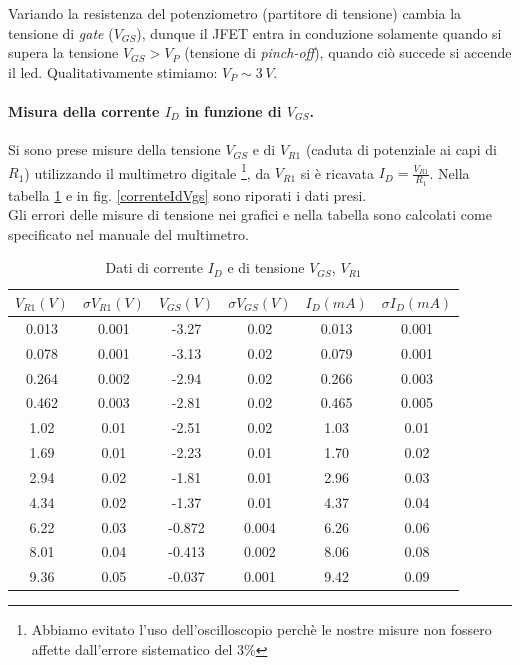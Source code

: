 \documentclass[10pt,a4paper]{article}
\begin{document}
Variando la resistenza del potenziometro (partitore di tensione) cambia la tensione di \emph{gate} ($V_{GS}$), dunque il JFET entra in conduzione solamente quando si supera la tensione $V_{GS} > V_{P}$ (tensione di \emph{pinch-off}), quando ciò succede si accende il led. Qualitativamente stimiamo: $V_P \sim 3\,V$. 

\paragraph{Misura della corrente $I_D$ in funzione di $V_{GS}$.}
Si sono prese misure della tensione $V_{GS}$ e di $V_{R1}$ (caduta di potenziale ai capi di $R_1$) utilizzando il multimetro digitale \footnote{Abbiamo evitato l'uso dell'oscilloscopio perchè le nostre misure non fossero affette dall'errore sistematico del $3\%$}, da $V_{R1}$ si è ricavata $I_D = \frac{V_{R1}}{R_1}$. Nella tabella \ref{correnteId} e in fig. \ref{correnteIdVgs} sono riporati i dati presi.\\
Gli errori delle misure di tensione nei grafici e nella tabella sono calcolati come specificato nel manuale del multimetro.

\begin{table}[!htb]\centering
\begin{tabular}{|c|c|c|c|c|c|}
\hline
$ V_{R1} (V)$ & $ \sigma V_{R1} (V) $ & $V_{GS} (V) $ & $\sigma V_{GS} (V)$ & $I_D (mA)$ & $\sigma I_D (mA)$\\ 
\hline
0.013 & 0.001 & -3.27 & 0.02 & 0.013 & 0.001\\
0.078 & 0.001 & -3.13 & 0.02 & 0.079 & 0.001\\
0.264 & 0.002 & -2.94 & 0.02 & 0.266 & 0.003\\
0.462 & 0.003 & -2.81 & 0.02 & 0.465 & 0.005\\
1.02 & 0.01 & -2.51 & 0.02 & 1.03 & 0.01\\
1.69 & 0.01 & -2.23 & 0.01 & 1.70 & 0.02\\
2.94 & 0.02 & -1.81 & 0.01 & 2.96 & 0.03\\
4.34 & 0.02 & -1.37 & 0.01 & 4.37 & 0.04\\
6.22 & 0.03 & -0.872 & 0.004 & 6.26 & 0.06\\
8.01 & 0.04 & -0.413 & 0.002 & 8.06 & 0.08\\
9.36 & 0.05 & -0.037 & 0.001 & 9.42 & 0.09\\
\hline
\end{tabular}
\caption{Dati di corrente $I_D$ e di tensione $V_{GS}$, $V_{R1}$}
\label{correnteId}
\end{table}
\end{document}
